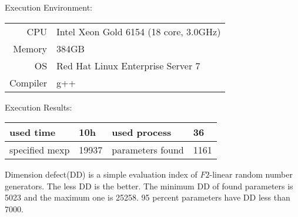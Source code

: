 \documentclass{article}
\begin{document}
\begin{center}
  Execution Environment:\\
  \medskip
\begin{tabular}{rl} \hline
  CPU & Intel Xeon Gold 6154 (18 core, 3.0GHz)\\
  Memory & 384GB \\
  OS & Red Hat Linux Enterprise Server 7\\
  Compiler & g++ \\
  \hline
\end{tabular}

\bigskip
Execution Results:\\
\medskip
\begin{tabular}{ll|ll} \hline
  used time & 10h & used process & 36 \\ \hline
  specified mexp & 19937 & parameters found & 1161 \\
  \hline
\end{tabular}
\end{center}

Dimension defect(DD)\cite[\S 1.2]{MT} is a simple evaluation index of
$F2$-linear random number generators. The less DD is the better.
The minimum DD of found parameters is 5023 and the maximum one
is 25258. 95 percent parameters have DD less than 7000.



\end{document}
